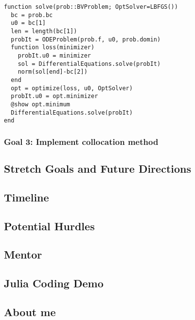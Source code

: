 \documentclass[a4paper,12pt,onecolumn]{article}
\begin{document}
\begin{lstlisting}[mathescape=true]
function solve(prob::BVProblem; OptSolver=LBFGS())
  bc = prob.bc
  u0 = bc[1]
  len = length(bc[1])
  probIt = ODEProblem(prob.f, u0, prob.domin)
  function loss(minimizer)
    probIt.u0 = minimizer
    sol = DifferentialEquations.solve(probIt)
    norm(sol[end]-bc[2])
  end
  opt = optimize(loss, u0, OptSolver)
  probIt.u0 = opt.minimizer
  @show opt.minimum
  DifferentialEquations.solve(probIt)
end
\end{lstlisting}

\subsubsection{Goal 3: Implement collocation method}


\subsection{Stretch Goals and Future Directions}

\subsection{Timeline}

\subsection{Potential Hurdles} %
\label{sub:potential_hurdles}


\subsection{Mentor} %
\label{sub:mentor}




\subsection{Julia Coding Demo} %
\label{ssub:julia_coding_demo}


\subsection{About me} %
\label{ssub:about_me}
\end{document}
